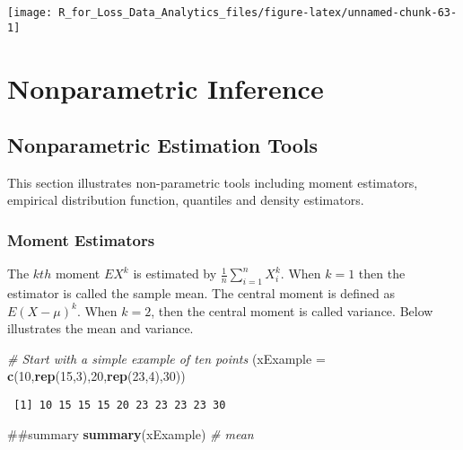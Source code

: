 \documentclass[]{book}
\newenvironment{Shaded}{\begin{snugshade}}{\end{snugshade}}
\newcommand{\KeywordTok}[1]{\textcolor[rgb]{0.13,0.29,0.53}{\textbf{#1}}}
\newcommand{\DataTypeTok}[1]{\textcolor[rgb]{0.13,0.29,0.53}{#1}}
\newcommand{\DecValTok}[1]{\textcolor[rgb]{0.00,0.00,0.81}{#1}}
\newcommand{\CommentTok}[1]{\textcolor[rgb]{0.56,0.35,0.01}{\textit{#1}}}
\newcommand{\NormalTok}[1]{#1}
\theoremstyle{definition}
\theoremstyle{definition}
\theoremstyle{definition}
\theoremstyle{remark}
\begin{document}
\begin{center}\texttt{[image: R\_for\_Loss\_Data\_Analytics\_files/figure-latex/unnamed-chunk-63-1]} \end{center}

\section{Nonparametric Inference}\label{nonparametric-inference}

\subsection{Nonparametric Estimation
Tools}\label{nonparametric-estimation-tools}

This section illustrates non-parametric tools including moment
estimators, empirical distribution function, quantiles and density
estimators.

\subsubsection{Moment Estimators}\label{moment-estimators}

The \(kth\) moment \(EX^k\) is estimated by
\(\frac{1}{n}\sum_{i=1}^{n}X_i^k\). When \(k=1\) then the estimator is
called the sample mean. The central moment is defined as \(E(X-\mu)^k\).
When \(k=2\), then the central moment is called variance. Below
illustrates the mean and variance.

\begin{Shaded}
\begin{Highlighting}[]
\CommentTok{# Start with a simple example of ten points}
\NormalTok{(}\DataTypeTok{xExample =} \KeywordTok{c}\NormalTok{(}\DecValTok{10}\NormalTok{,}\KeywordTok{rep}\NormalTok{(}\DecValTok{15}\NormalTok{,}\DecValTok{3}\NormalTok{),}\DecValTok{20}\NormalTok{,}\KeywordTok{rep}\NormalTok{(}\DecValTok{23}\NormalTok{,}\DecValTok{4}\NormalTok{),}\DecValTok{30}\NormalTok{))}
\end{Highlighting}
\end{Shaded}

\begin{verbatim}
 [1] 10 15 15 15 20 23 23 23 23 30
\end{verbatim}

\begin{Shaded}
\begin{Highlighting}[]
\NormalTok{##summary}
\KeywordTok{summary}\NormalTok{(xExample) }\CommentTok{# mean }
\end{Highlighting}
\end{Shaded}
\end{document}

